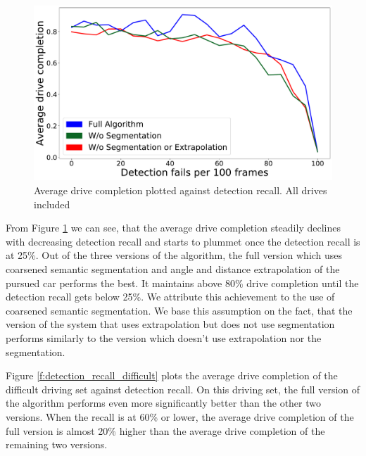\documentclass{ctuthesis/ctuthesis}
\begin{document}
\begin{figure}[]
    \centering
    \includegraphics[width=1\textwidth]{images/recall_chart7.pdf}
    
    \caption{Average drive completion plotted against detection recall. All drives included}\label{f:detection_recall}
\end{figure}

From Figure \ref{f:detection_recall} we can see, that the average drive completion steadily declines with decreasing detection recall and starts to plummet once the detection recall is at 25\%. Out of the three versions of the algorithm, the full version which uses coarsened semantic segmentation and angle and distance extrapolation of the pursued car performs the best. It maintains above 80\% drive completion until the detection recall gets below 25\%. We attribute this achievement to the use of coarsened semantic segmentation. We base this assumption on the fact, that the version of the system that uses extrapolation but does not use segmentation performs similarly to the version which doesn't use extrapolation nor the segmentation. \par

Figure \ref{f:detection_recall_difficult} plots the average drive completion of the difficult driving set against detection recall. On this driving set, the full version of the algorithm performs even more significantly better than the other two versions. When the recall is at 60\% or lower, the average drive completion of the full version is almost 20\% higher than the average drive completion of the remaining two versions.
\end{document}

